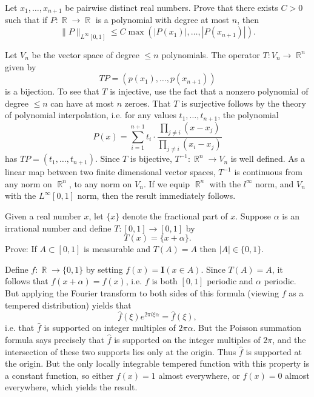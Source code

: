 \documentclass{exam}
\DeclareMathOperator{\RR}{\mathbb{R}}
\theoremstyle{problemstyle}
\newcommand{\1}[1]{\textbf{1}_{\left[#1\right]}} %
\begin{document}
\begin{questions}
\question Let $x_1,\dots,x_{n+1}$ be pairwise distinct real numbers. Prove that there exists $C > 0$ such that if $P: \RR \to \RR$ is a polynomial with degree at most $n$, then
%
\[ \| P \|_{L^\infty[0,1]}\leq C \max \left( |P(x_1)|, \dots, |P(x_{n+1})| \right). \]
\begin{solution}
	Let $V_n$ be the vector space of degree $\leq n$ polynomials. The operator $T: V_n \to \RR^n$ given by
	\[ TP = ( p(x_1), \dots, p(x_{n+1}) ) \]
	is a bijection. To see that $T$ is injective, use the fact that a nonzero polynomial of degree $\leq n$ can have at most $n$ zeroes. That $T$ is surjective follows by the theory of polynomial interpolation, i.e. for any values $t_1,\dots,t_{n+1}$, the polynomial
	\[ P(x) = \sum_{i = 1}^{n+1} t_i \cdot \frac{\prod_{j \neq i} (x - x_j)}{\prod_{j \neq i} (x_i - x_j)} \]
	has $TP = (t_1,\dots,t_{n+1})$. Since $T$ is bijective, $T^{-1}: \RR^n \to V_n$ is well defined. As a linear map between two finite dimensional vector spaces, $T^{-1}$ is continuous from any norm on $\RR^n$, to any norm on $V_n$. If we equip $\RR^n$ with the $l^\infty$ norm, and $V_n$ with the $L^\infty[0,1]$ norm, then the result immediately follows.
\end{solution}

\question Given a real number $x$, let $\{ x \}$ denote the fractional part of $x$. Suppose $\alpha$ is an irrational number and define $T: [0,1] \to [0,1]$ by
%
\[ T(x) = \{ x + \alpha \}. \]
%
Prove: If $A \subset [0,1]$ is measurable and $T(A) = A$ then $|A| \in \{ 0, 1 \}$.
\begin{solution}
	Define $f: \RR \to \{ 0, 1 \}$ by setting $f(x) = \mathbf{I}(x \in A)$. Since $T(A) = A$, it follows that $f(x + \alpha) = f(x)$, i.e. $f$ is both $[0,1]$ periodic and $\alpha$ periodic. But applying the Fourier transform to both sides of this formula (viewing $f$ as a tempered distribution) yields that
	\[ \widehat{f}(\xi) e^{2 \pi i \xi \alpha} = \widehat{f}(\xi), \]
	i.e. that $\widehat{f}$ is supported on integer multiples of $2 \pi \alpha$. But the Poisson summation formula says precisely that $\widehat{f}$ is supported on the integer multiples of $2 \pi$, and the intersection of these two supports lies only at the origin. Thus $\widehat{f}$ is supported at the origin. But the only locally integrable tempered function with this property is a constant function, so either $f(x) = 1$ almost everywhere, or $f(x) = 0$ almost everywhere, which yields the result.


\end{solution}
\end{questions}
\end{document}
